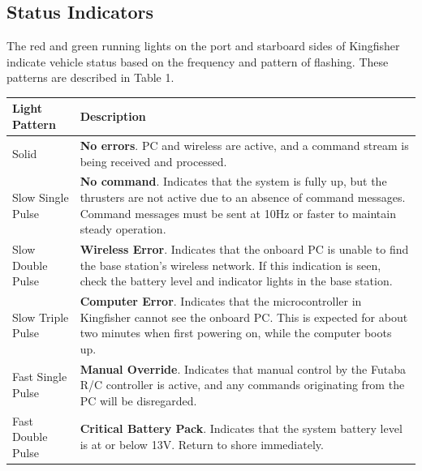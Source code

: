 \documentclass[]{clearpath-latex/clearpath-manual}
\begin{document}
\subsection{Status Indicators}
The red and green running lights on the port and starboard sides of Kingfisher indicate vehicle status based on the frequency and pattern of flashing. These patterns are described in Table 1.

\bgroup
\def\arraystretch{1.5}%
\begin{table}[h]
\centering
\label{kf-statusindicator}
\begin{tabular}{m{} p{}}
\rowcolor{lightgrey} 
Light Pattern     & Description                                                                                                                                                                                              \\ \hline
Solid             & \textbf{No errors}. PC and wireless are active, and a command stream is being received and processed.                                                                                                             \\ \hline
Slow Single Pulse & \textbf{No command}. Indicates that the system is fully up, but the thrusters are not active due to an absence of command messages. Command messages must be sent at 10Hz or faster to maintain steady operation. \\ \hline
Slow Double Pulse & \textbf{Wireless Error}. Indicates that the onboard PC is unable to find the base station’s wireless network. If this indication is seen, check the battery level and indicator lights in the base station.       \\ \hline
Slow Triple Pulse & \textbf{Computer Error}. Indicates that the microcontroller in Kingfisher cannot see the onboard PC. This is expected for about two minutes when first powering on, while the computer boots up.                  \\ \hline
Fast Single Pulse & \textbf{Manual Override}. Indicates that manual control by the Futaba R/C controller is active, and any commands originating from the PC will be disregarded.                                                     \\ \hline
Fast Double Pulse & \textbf{Critical Battery Pack}. Indicates that the system battery level is at or below 13V. Return to shore immediately. \\ \hline                                                                                        
\end{tabular}
\end{table}
\egroup
\end{document}
